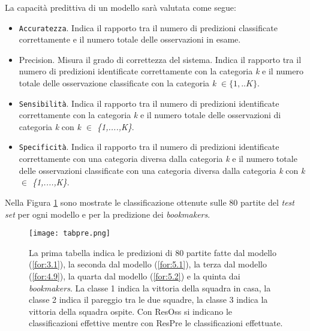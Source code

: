 La capacità predittiva di un modello sarà valutata come segue:
\begin{itemize}
	\item \texttt{Accuratezza}. Indica il rapporto tra il numero di predizioni classificate correttamente e il numero totale delle osservazioni in esame.
	\item \textsf{Precision}. Misura il grado di correttezza del sistema. Indica il rapporto tra il numero di predizioni identificate correttamente con la categoria \emph{k} e il numero totale delle osservazione classificate con la categoria \emph{k} $\in \{1,..K\}$.
	\item \texttt{Sensibilità}. Indica il rapporto tra il numero di predizioni identificate correttamente con la categoria \emph{k} e il numero totale delle osservazioni di categoria \emph{k} con \emph{k $\in$ \{1,....,K\}}.
	\item \texttt{Specificità}. Indica il rapporto tra il numero di predizioni identificate correttamente con una categoria diversa dalla categoria \emph{k} e il numero totale delle osservazioni classificate con una categoria diversa dalla categoria \emph{k} con \emph{k $\in$ \{1,....,K\}}.
\end{itemize}
Nella Figura \ref{fig:pre} sono mostrate le classificazione ottenute sulle 80 partite del \emph{test set} per ogni modello e per la predizione dei \emph{bookmakers}.
\begin{figure}[h]
	\begin{center}
		\texttt{[image: tabpre.png]}
		\caption{La prima tabella indica le predizioni di 80 partite fatte dal modello (\ref{for:3.1}), la seconda dal modello (\ref{for:5.1}), la terza dal modello (\ref{for:4.9}), la quarta dal modello (\ref{for:5.2}) e la quinta dai \emph{bookmakers}. La classe 1 indica la vittoria della squadra in casa, la classe 2 indica il pareggio tra le due squadre, la classe 3 indica la vittoria della squadra ospite. Con \textsf{ResOss} si indicano le classificazioni effettive mentre con \textsf{ResPre} le classificazioni effettuate.}\label{fig:pre}
	\end{center}
\end{figure}
